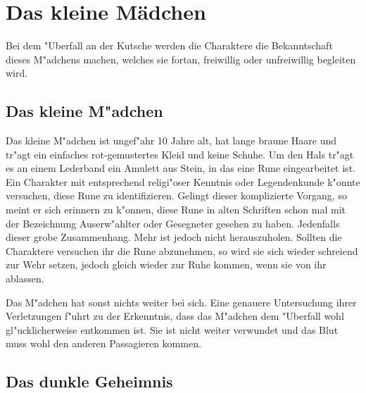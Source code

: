 \chapter{Das kleine Mädchen}
\par Bei dem "Uberfall an der Kutsche werden die Charaktere die Bekanntschaft dieses M"adchens machen, welches sie fortan, freiwillig oder unfreiwillig begleiten wird.

\section{Das kleine M"adchen}
\par Das kleine M"adchen ist ungef"ahr 10 Jahre alt, hat lange braune Haare und tr"agt ein einfaches rot-gemustertes Kleid und keine Schuhe.
Um den Hals tr"agt es an einem Lederband ein Amulett aus Stein, in das eine Rune eingearbeitet ist. Ein Charakter mit entsprechend religi"oser Kenntnis oder Legendenkunde k"onnte versuchen, diese Rune zu identifizieren. Gelingt dieser komplizierte Vorgang, so meint er sich erinnern zu k"onnen, diese Rune in alten Schriften schon mal mit der Bezeichnung \glqq Auserw"ahlter\grqq{} oder \glqq Gesegneter\grqq{} gesehen zu haben. Jedenfalls dieser grobe Zusammenhang. Mehr ist jedoch nicht herauszuholen. Sollten die Charaktere versuchen ihr die Rune abzunehmen, so wird sie sich wieder schreiend zur Wehr setzen, jedoch gleich wieder zur Ruhe kommen, wenn sie von ihr ablassen.
\par Das M"adchen hat sonst nichts weiter bei sich. Eine genauere Untersuchung ihrer Verletzungen f"uhrt zu der Erkenntnis, dass das M"adchen dem "Uberfall wohl gl"ucklicherweise entkommen ist. Sie ist nicht weiter verwundet und das Blut muss wohl den anderen Passagieren kommen.

\section{Das dunkle Geheimnis}
